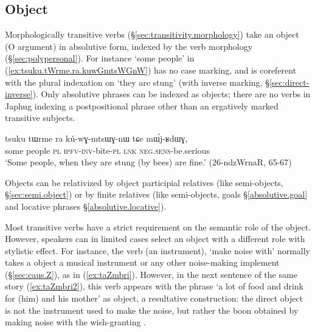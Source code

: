 \subsection{Object} \label{sec:absolutive.P}
Morphologically transitive verbs (§\ref{sec:transitivity.morphology}) take an object (O argument) in absolutive form, indexed by the verb morphology (§\ref{sec:polypersonal}). For instance  `some people' in (\ref{ex:tsuku.tWrme.ra.kuwGmtsWGnW}) has no case marking, and is coreferent with the plural indexation on  `they are stung' (with inverse marking, §\ref{sec:direct-inverse}). Only absolutive phrases can be indexed as objects; there are no verbs in Japhug indexing a postpositional phrase other than an ergatively marked transitive subjects.

\begin{exe}
\ex \label{ex:tsuku.tWrme.ra.kuwGmtsWGnW}
\gll tsuku tɯrme ra kú-wɣ-mtsɯɣ-nɯ tɕe mɯ́j-ʁdɯɣ, \\
some people \textsc{pl} \textsc{ipfv}-\textsc{inv}-bite-\textsc{pl} \textsc{lnk} \textsc{neg}.\textsc{sens}-be.serious \\
\glt `Some people, when they are stung (by bees) are fine.' (26-ndzWrnaR, 65-67)
\end{exe}

Objects can be relativized by object participial relatives (like semi-objects, §\ref{sec:semi.object}) or by finite relatives (like semi-objects, goals §\ref{absolutive.goal}  and locative phrases §\ref{absolutive.locative}).

Most transitive verbs have  a strict requirement on the semantic role of the object. However, speakers can in limited cases select an object with a different role with stylistic effect. For instance, the verb  (an instrument), `make noise with' normally takes a object a musical instrument or any other noise-making implement  (§\ref{sec:caus.Z}), as in (\ref{ex:taZmbri}). However, in the next sentence of the same story (\ref{ex:taZmbri2}), this verb appears with the phrase  `a lot of food and drink for (him) and his mother' as object, a resultative construction: the direct object is not the instrument used to make the noise, but rather the boon obtained by making noise with the wish-granting .

